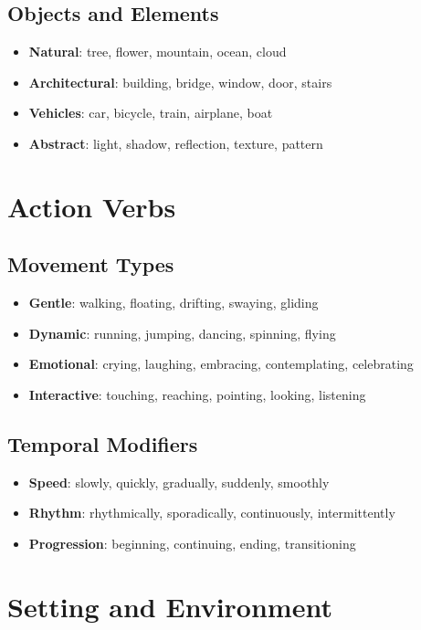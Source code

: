 \subsection{Objects and Elements}
\begin{itemize}
\item \textbf{Natural}: tree, flower, mountain, ocean, cloud
\item \textbf{Architectural}: building, bridge, window, door, stairs
\item \textbf{Vehicles}: car, bicycle, train, airplane, boat
\item \textbf{Abstract}: light, shadow, reflection, texture, pattern
\end{itemize}

\section{Action Verbs}

\subsection{Movement Types}
\begin{itemize}
\item \textbf{Gentle}: walking, floating, drifting, swaying, gliding
\item \textbf{Dynamic}: running, jumping, dancing, spinning, flying
\item \textbf{Emotional}: crying, laughing, embracing, contemplating, celebrating
\item \textbf{Interactive}: touching, reaching, pointing, looking, listening
\end{itemize}

\subsection{Temporal Modifiers}
\begin{itemize}
\item \textbf{Speed}: slowly, quickly, gradually, suddenly, smoothly
\item \textbf{Rhythm}: rhythmically, sporadically, continuously, intermittently
\item \textbf{Progression}: beginning, continuing, ending, transitioning
\end{itemize}

\section{Setting and Environment}

